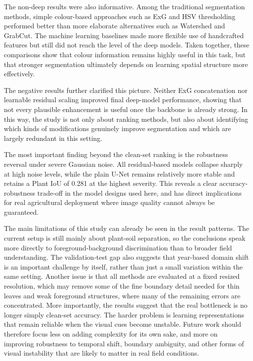 \documentclass[conference]{IEEEtran}
\begin{document}
The non-deep results were also informative. Among the traditional
segmentation methods, simple colour-based approaches such as ExG and
HSV thresholding performed better than more elaborate alternatives such
as Watershed and GrabCut. The machine learning baselines made more
flexible use of handcrafted features but still did not reach the level
of the deep models. Taken together, these comparisons show that colour
information remains highly useful in this task, but that stronger
segmentation ultimately depends on learning spatial structure more
effectively.

The negative results further clarified this picture. Neither ExG
concatenation nor learnable residual scaling improved final deep-model
performance, showing that not every plausible enhancement is useful once
the backbone is already strong. In this way, the study is not only about
ranking methods, but also about identifying which kinds of modifications
genuinely improve segmentation and which are largely redundant in this
setting.

The most important finding beyond the clean-set ranking is the
robustness reversal under severe Gaussian noise. All residual-based
models collapse sharply at high noise levels, while the plain U-Net
remains relatively more stable and retains a Plant IoU of 0.281 at the
highest severity. This reveals a clear accuracy-robustness trade-off in
the model designs used here, and has direct implications for real
agricultural deployment where image quality cannot always be guaranteed.

The main limitations of this study can already be seen in the result
patterns. The current setup is still mainly about plant-soil separation,
so the conclusions speak more directly to foreground-background
discrimination than to broader field understanding. The validation-test
gap also suggests that year-based domain shift is an important challenge
by itself, rather than just a small variation within the same setting.
Another issue is that all methods are evaluated at a fixed resized
resolution, which may remove some of the fine boundary detail needed for
thin leaves and weak foreground structures, where many of the remaining
errors are concentrated. More importantly, the results suggest that the
real bottleneck is no longer simply clean-set accuracy. The harder
problem is learning representations that remain reliable when the visual
cues become unstable. Future work should therefore focus less on adding
complexity for its own sake, and more on improving robustness to
temporal shift, boundary ambiguity, and other forms of visual
instability that are likely to matter in real field conditions.
\end{document}
